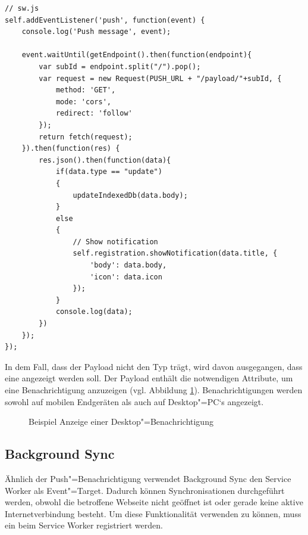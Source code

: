 \begin{lstlisting}[caption={Service Worker \code{push}"=EventListener},label={lst_realisierung_push-event-listener}, frame=single]
// sw.js
self.addEventListener('push', function(event) {
    console.log('Push message', event);

    event.waitUntil(getEndpoint().then(function(endpoint){
        var subId = endpoint.split("/").pop();
        var request = new Request(PUSH_URL + "/payload/"+subId, {
            method: 'GET',
            mode: 'cors',
            redirect: 'follow'
        });
        return fetch(request);
    }).then(function(res) {
        res.json().then(function(data){
            if(data.type == "update")
            {
                updateIndexedDb(data.body);
            }
            else
            {
                // Show notification
                self.registration.showNotification(data.title, {
                    'body': data.body,
                    'icon': data.icon
                });
            }
            console.log(data);
        })
    });
});
\end{lstlisting}

In dem Fall, dass der Payload nicht den Typ  trägt, wird davon ausgegangen, dass eine  angezeigt werden soll. Der Payload enthält die notwendigen Attribute, um eine Benachrichtigung anzuzeigen (vgl. Abbildung \ref{image_implementierung_notification}). Benachrichtigungen werden sowohl auf mobilen Endgeräten als auch auf Desktop"=PC`s angezeigt. \\

\begin{figure}[htp] 
\caption{Beispiel Anzeige einer Desktop"=Benachrichtigung}
\label{image_implementierung_notification}
\end{figure} 

\newpage
\subsection{Background Sync}
\label{subsec_implementierung_background-sync}

Ähnlich der Push"=Benachrichtigung verwendet Background Sync den Service Worker als Event"=Target. Dadurch können Synchronisationen durchgeführt werden, obwohl die betroffene Webseite nicht geöffnet ist oder gerade keine aktive Internetverbindung besteht. Um diese Funktionalität verwenden zu können, muss ein  beim Service Worker registriert werden. \\

